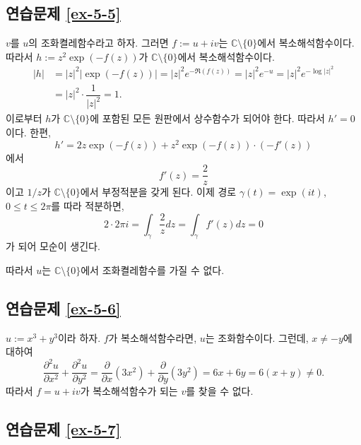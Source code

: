 \subsection*{연습문제 \ref{ex-5-5}}

$v$를 $u$의 조화켤레함수라고 하자.
그러면 $f:= u+iv$는 $\mathbb C\setminus \{0\}$에서
복소해석함수이다. 
따라서 $h:= z^2 \exp(-f(z))$가 $\mathbb C\setminus \{0\}$에서
복소해석함수이다. 
\begin{align*}
|h| & = |z|^2|\exp(-f(z))| = |z|^2 e^{-\Re(f(z))} = |z|^2e^{-u}
= |z|^2e^{-\log |z|^2} \\
&= |z|^2\cdot \dfrac1{|z|^2} = 1.
\end{align*}
이로부터 $h$가 $\mathbb C\setminus \{0\}$에 포함된 모든 원판에서 상수함수가 되어야 한다.
따라서 $h'=0$이다.
한편,
\[
h' = 2z \exp(-f(z)) + z^2\exp(-f(z))\cdot (-f'(z))
\]
에서
\[
f'(z) = \dfrac2z
\]
이고 $1/z$가 $\mathbb C\setminus \{0\}$에서 부정적분을 갖게 된다.
이제 경로 $\gamma(t) =\exp(it)$, $0\le t \le 2\pi$를 따라 적분하면,
\[
2\cdot 2\pi i = \int_\gamma \dfrac2z dz = \int_\gamma f'(z)dz = 0
\]
가 되어 모순이 생긴다.

따라서 $u$는 $\mathbb C\setminus \{0\}$에서 조화켤레함수를 가질 수 없다.

\subsection*{연습문제 \ref{ex-5-6}}

$u:=x^3+y^3$이라 하자.
$f$가 복소해석함수라면, $u$는 조화함수이다.
그런데, $x\ne -y$에 대하여
\[
\dfrac{\partial^2 u}{\partial x^2} + \dfrac{\partial^2 u}{\partial y^2}
= \dfrac{\partial}{\partial x}(3x^2) + \dfrac{\partial}{\partial y}(3y^2)
= 6x + 6y = 6(x+y) \ne 0.
\]
따라서 $f=u+iv$가 복소해석함수가 되는 $v$를 찾을 수 없다.

\subsection*{연습문제 \ref{ex-5-7}}


